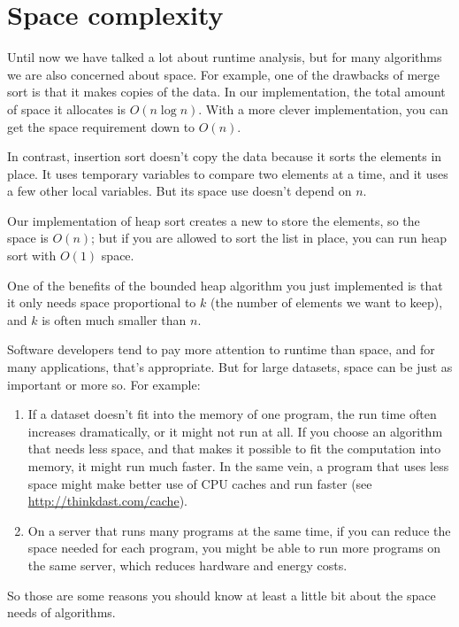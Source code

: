 \documentclass[12pt]{book}
\theoremstyle{exercise}
\begin{document}
\section{Space complexity}
\label{space-complexity}


Until now we have talked a lot about runtime analysis, but for many
algorithms we are also concerned about space. For example, one of the
drawbacks of merge sort is that it makes copies of the data. In our
implementation, the total amount of space it allocates is
$O(n \log n)$. With a more clever implementation, you can get the
space requirement down to $O(n)$.

In contrast, insertion sort doesn't copy the data because it sorts the
elements in place. It uses temporary variables to compare two elements
at a time, and it uses a few other local variables. But its space use
doesn't depend on $n$.

Our implementation of heap sort creates a new  to
store the elements, so the space is $O(n)$; but if you are
allowed to sort the list in place, you can run heap sort with
$O(1)$ space.

One of the benefits of the bounded heap algorithm you just implemented
is that it only needs space proportional to $k$ (the number of
elements we want to keep), and $k$ is often much smaller than
$n$.

Software developers tend to pay more attention to runtime than space, and
for many applications, that's appropriate. But for large datasets, space
can be just as important or more so. For example:

\begin{enumerate}

\item If a dataset doesn't fit into the memory of one program, the run
  time often increases dramatically, or it might not run at all. If you
  choose an algorithm that needs less space, and that makes it possible
  to fit the computation into memory, it might run much faster. In the
  same vein, a program that uses less space might make better use of
  CPU caches and run
  faster (see \url{http://thinkdast.com/cache}).

\item On a server that runs many programs at the same time, if you can
  reduce the space needed for each program, you might be able to run
  more programs on the same server, which reduces hardware and energy
  costs.

\end{enumerate}

So those are some reasons you should know at least a little bit about
the space needs of algorithms.



\backmatter
\printindex

\end{document}
